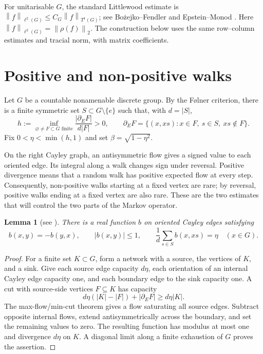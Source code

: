 \documentclass[a4paper,11pt]{amsproc}
\numberwithin{equation}{section}
\newtheorem{lemma}[theorem]{Lemma}
\theoremstyle{definition}
\newcommand{\norm}[1]{\left\lVert#1\right\rVert}
\begin{document}
For unitarisable $G$, the standard Littlewood estimate is
$\norm{f}_{\ell^2(G)}\le C_G\norm{f}_{T^1(G)}$; see Bo\.{z}ejko--Fendler \cite{bf} and Epstein--Monod \cite[Proposition 2.4]{em}. Here $\norm{f}_{\ell^2(G)}=\norm{\rho(f)}_2$. The construction below uses the same row--column estimates and tracial norm, with matrix coefficients.

\section{Positive and non-positive walks}
Let $G$ be a countable nonamenable discrete group. By the F\o lner criterion, there is a finite symmetric set $S\subset G\setminus\{e\}$ such that, with $d=|S|$,
\begin{equation}\label{eq:cheeger}
 h:=\inf_{\varnothing\ne F\subset G\text{ finite}}
 \frac{|\partial_E F|}{d|F|}>0,
 \qquad
 \partial_EF=\{(x,xs):x\in F,\ s\in S,\ xs\notin F\}.
\end{equation}
Fix $0<\eta<\min(h,1)$ and set $\beta=\sqrt{1-\eta^2}$.

On the right Cayley graph, an antisymmetric flow gives a signed value to each oriented edge. Its integral along a walk changes sign under reversal. Positive divergence means that a random walk has positive expected flow at every step. Consequently, non-positive walks starting at a fixed vertex are rare; by reversal, positive walks ending at a fixed vertex are also rare. These are the two estimates that will control the two parts of the Markov operator.

\begin{lemma}[see {\cite[Proposition 2.1]{blps}}]\label{lem:flow}
There is a real function $b$ on oriented Cayley edges satisfying
\begin{equation}\label{eq:flow}
 b(x,y)=-b(y,x),\qquad |b(x,y)|\le1,\qquad
 \frac1d\sum_{s\in S}b(x,xs)=\eta\quad(x\in G).
\end{equation}
\end{lemma}
\begin{proof}
For a finite set $K\subset G$, form a network with a source, the vertices of $K$, and a sink. Give each source edge capacity $d\eta$, each orientation of an internal Cayley edge capacity one, and each boundary edge to the sink capacity one. A cut with source-side vertices $F\subseteq K$ has capacity
\[
 d\eta(|K|-|F|)+|\partial_E F|\ge d\eta|K|.
\]
The max-flow/min-cut theorem gives a flow saturating all source edges. Subtract opposite internal flows, extend antisymmetrically across the boundary, and set the remaining values to zero. The resulting function has modulus at most one and divergence $d\eta$ on $K$. A diagonal limit along a finite exhaustion of $G$ proves the assertion.
\end{proof}
\end{document}
